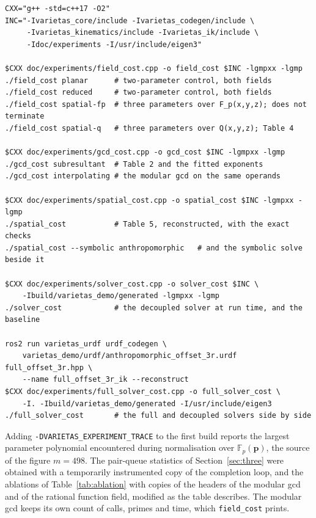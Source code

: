 \documentclass[11pt,a4paper]{article}
\theoremstyle{plain}
\theoremstyle{definition}
\theoremstyle{remark}
\newcommand{\FF}{\mathbb{F}}
\newcommand{\bp}{\boldsymbol{p}}
\begin{document}
\begin{verbatim}
CXX="g++ -std=c++17 -O2"
INC="-Ivarietas_core/include -Ivarietas_codegen/include \
     -Ivarietas_kinematics/include -Ivarietas_ik/include \
     -Idoc/experiments -I/usr/include/eigen3"

$CXX doc/experiments/field_cost.cpp -o field_cost $INC -lgmpxx -lgmp
./field_cost planar      # two-parameter control, both fields
./field_cost reduced     # two-parameter control, both fields
./field_cost spatial-fp  # three parameters over F_p(x,y,z); does not terminate
./field_cost spatial-q   # three parameters over Q(x,y,z); Table 4

$CXX doc/experiments/gcd_cost.cpp -o gcd_cost $INC -lgmpxx -lgmp
./gcd_cost subresultant  # Table 2 and the fitted exponents
./gcd_cost interpolating # the modular gcd on the same operands

$CXX doc/experiments/spatial_cost.cpp -o spatial_cost $INC -lgmpxx -lgmp
./spatial_cost           # Table 5, reconstructed, with the exact checks
./spatial_cost --symbolic anthropomorphic   # and the symbolic solve beside it

$CXX doc/experiments/solver_cost.cpp -o solver_cost $INC \
    -Ibuild/varietas_demo/generated -lgmpxx -lgmp
./solver_cost            # the decoupled solver at run time, and the baseline

ros2 run varietas_urdf urdf_codegen \
    varietas_demo/urdf/anthropomorphic_offset_3r.urdf full_offset_3r.hpp \
    --name full_offset_3r_ik --reconstruct
$CXX doc/experiments/full_solver_cost.cpp -o full_solver_cost \
    -I. -Ibuild/varietas_demo/generated -I/usr/include/eigen3
./full_solver_cost       # the full and decoupled solvers side by side
\end{verbatim}

\noindent
Adding \verb|-DVARIETAS_EXPERIMENT_TRACE| to the first build reports the largest parameter polynomial
encountered during normalisation over $\FF_p(\bp)$, the source of the figure $m = 498$. The pair-queue
statistics of Section~\ref{sec:three} were obtained with a temporarily instrumented copy of the
completion loop, and the ablations of Table~\ref{tab:ablation} with copies of the headers of the
modular gcd and of the rational function field, modified as the table describes. The
modular gcd keeps its own count of calls, primes and time, which \texttt{field\_cost} prints.
\end{document}
